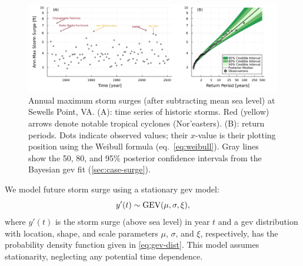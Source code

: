 \documentclass[11pt]{article}
\begin{document}
\begin{figure}
    \centering
    \includegraphics[width=\textwidth]{surge-obs-return}
    \caption{
        Annual maximum storm surges (after subtracting mean sea level) at Sewells Point, VA.
        (A):
        time series of historic storms.
        Red (yellow) arrows denote notable tropical cyclones (Nor'easters).
        (B):
        return periods.
        Dots indicate observed values; their $x$-value is their plotting position using the Weibull formula (eq.~\ref{eq:weibull}).
        Gray lines show the 50, 80, and 95\% posterior confidence intervals from the Bayesian \gls{gev} fit (\cref{sec:case-surge}).
    }\label{fig:surge-obs-return}
\end{figure}

We model future storm surge using a stationary \gls{gev} model:
\begin{equation}\label{eq:surge-model}
    y'(t) \sim \text{GEV}\qty(\mu, \sigma, \xi),
\end{equation}
where $y'(t)$ is the storm surge (above sea level) in year $t$ and a \gls{gev} distribution with location, shape, and scale parameters $\mu$, $\sigma$, and $\xi$, respectively, has the probability density function given in \cref{eq:gev-dist}.
This model assumes stationarity, neglecting any potential time dependence.
\end{document}
